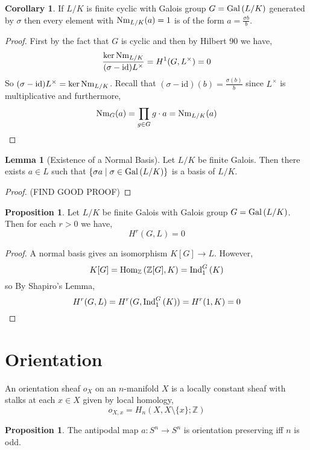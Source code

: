 \documentclass[12pt]{extarticle}
\newcommand{\Hom}[3]{\mathrm{Hom}_{#1}\left( #2, #3 \right)}
\newcommand{\Z}{\mathbb{Z}}
\newcommand{\id}{\mathrm{id}}
\theoremstyle{definition}
\newtheorem{lemma}[theorem]{Lemma}
\newtheorem{proposition}[theorem]{Proposition}
\newtheorem{corollary}[theorem]{Corollary}
\newenvironment{definition}[1][Definition:]{\begin{trivlist}
\item[\hskip \labelsep {\bfseries #1}]}{\end{trivlist}}
\begin{document}
\begin{corollary}
If $L / K$ is finite cyclic with Galois group $G = \mathrm{Gal}\left( L/K \right)$ generated by $\sigma$ then every element with $\mathrm{Nm}_{L/K} (a) = 1$ is of the form $a = \frac{\sigma b}{b}$. 
\end{corollary}

\begin{proof}
First by the fact that $G$ is cyclic and then by Hilbert 90 we have,
\[ \frac{\ker{\Nm_{L/K}}}{(\sigma - \id)L^\times} = H^1(G, L^\times) = 0 \]
So $(\sigma - \id) L^\times = \ker{\Nm_{L/K}}$. Recall that $(\sigma - \id)(b) = \frac{\sigma(b)}{b}$ since $L^\times$ is multiplicative and furthermore,
\[ \mathrm{Nm}_{G}(a) = \prod_{g \in G} g \cdot a  = \mathrm{Nm}_{L/K}(a) \]
\end{proof}

\begin{lemma}[Existence of a Normal Basis]
Let $L/K$ be finite Galois. Then there exists $a \in L$ such that $\{ \sigma a \mid \sigma \in \mathrm{Gal}\left( L/K \right) \}$ is a basis of $L / K$. 
\end{lemma}

\begin{proof}
(FIND GOOD PROOF)
\end{proof}

\begin{proposition}
Let $L / K$ be finite Galois with Galois group $G = \mathrm{Gal}\left( L/K \right)$. Then for each $r > 0$ we have,
\[ H^r(G, L) = 0 \]
\end{proposition}

\begin{proof}
A normal basis gives an isomorphism $K[G] \to L$. However, 
\[ K[G] = \Hom{\Z}{\Z[G]}{K} = \Ind{G}{1}{K} \]
so By Shapiro's Lemma,
\[ H^r(G, L) = H^r(G, \mathrm{Ind}^{G}_{1} \left(K\right)) = H^r(1, K) = 0 \]
\end{proof}

\section{Orientation}

\begin{definition}
An orientation sheaf $o_X$ on an $n$-manifold $X$ is a locally constant sheaf with stalks at each $x \in X$ given by local homology,
\[ o_{X,x} = H_n(X, X \setminus \{ x \} ; \Z) \]
\end{definition}

\begin{proposition}
The antipodal map $a : S^n \to S^n$ is orientation preserving iff $n$ is odd.
\end{proposition}
\end{document}

